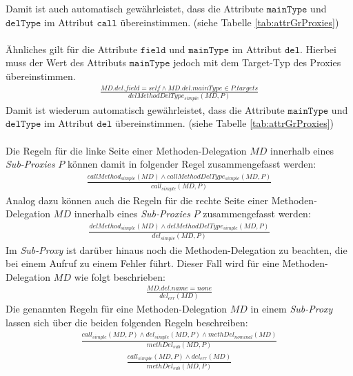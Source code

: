 \documentclass[a4paper,12pt]{article}
\begin{document}
Damit ist auch automatisch gewährleistet, dass die Attribute $\texttt{mainType}$ und $\texttt{delType}$ im Attribut $\texttt{call}$ übereinstimmen. (siehe Tabelle \ref{tab:attrGrProxies})\\\\
Ähnliches gilt für die Attribute $\texttt{field}$ und $\texttt{mainType}$ im Attribut $\texttt{del}$. Hierbei muss der Wert des Attributs $\texttt{mainType}$ jedoch mit dem Target-Typ des Proxies übereinstimmen.
\begin{gather*}
\frac{\mathit{MD.del.field} = \mathit{self} \wedge  \mathit{MD.del.mainType} \in \mathit{P.targets} }
{\mathit{delMethodDelType_{simple}(MD, P)}}
\end{gather*}
Damit ist wiederum automatisch gewährleistet, dass die Attribute $\texttt{mainType}$ und $\texttt{delType}$ im Attribut $\texttt{del}$ übereinstimmen. (siehe Tabelle \ref{tab:attrGrProxies})\\\\
Die Regeln für die linke Seite einer Methoden-Delegation $\mathit{MD}$ innerhalb eines \emph{Sub-Proxies} $P$ können damit in folgender Regel zusammengefasst werden:
\begin{gather*}
\frac{\mathit{callMethod_{simple}(MD)} \wedge \mathit{callMethodDelType_{simple}(MD,P)}}
{\mathit{call_{simple}(MD,P)}}
\end{gather*}
Analog dazu können auch die Regeln für die rechte Seite einer Methoden-Delegation $\mathit{MD}$ innerhalb eines \emph{Sub-Proxies} $P$ zusammengefasst werden:
\begin{gather*}
\frac{\mathit{delMethod_{simple}(MD)} \wedge \mathit{delMethodDelType_{simple}(MD,P)}}
{\mathit{del_{simple}(MD,P)}}
\end{gather*}
Im \emph{Sub-Proxy} ist darüber hinaus noch die Methoden-Delegation zu beachten, die bei einem Aufruf zu einem Fehler führt. Dieser Fall wird für eine Methoden-Delegation $\mathit{MD}$ wie folgt beschrieben:
\begin{gather*}
\frac{\mathit{MD.del.name} = \mathit{none}}
{\mathit{del_{err}(MD)}}
\end{gather*}
Die genannten Regeln für eine Methoden-Delegation $\mathit{MD}$ in einem \emph{Sub-Proxy} lassen sich über die beiden folgenden Regeln beschreiben:
\begin{gather*}
\frac{\mathit{call_{simple}(MD,P)} \wedge \mathit{del_{simple}(MD,P) \wedge \mathit{methDel_{nominal}(MD)}}}
{\mathit{methDel_{sub}(MD,P)}}
\end{gather*}
\begin{gather*}
\frac{\mathit{call_{simple}(MD,P)}\wedge\mathit{del_{err}(MD)}
}
{\mathit{methDel_{sub}(MD,P)}}
\end{gather*}
\end{document}
